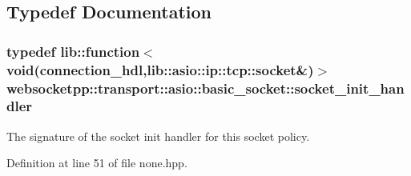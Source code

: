 \subsection{Typedef Documentation}
\hypertarget{namespacewebsocketpp_1_1transport_1_1asio_1_1basic__socket_a88f9c59fa40db3188769162db98edb93}{}
\subsubsection[{socket\+\_\+init\+\_\+handler}]{\setlength{\rightskip}{0pt plus 5cm}typedef lib\+::function$<$void({\bf connection\+\_\+hdl},lib\+::asio\+::ip\+::tcp\+::socket\&)$>$ {\bf websocketpp\+::transport\+::asio\+::basic\+\_\+socket\+::socket\+\_\+init\+\_\+handler}}\label{namespacewebsocketpp_1_1transport_1_1asio_1_1basic__socket_a88f9c59fa40db3188769162db98edb93}


The signature of the socket init handler for this socket policy. 



Definition at line 51 of file none.\+hpp.

